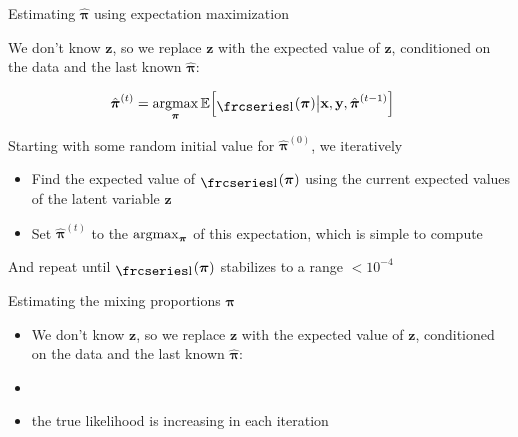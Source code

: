 \documentclass{beamer}
\newcommand{\textfrc}[1]{{\frcseries#1}}
\newcommand{\mathfrc}[1]{\raisebox{-0.8mm}{\text{\textfrc{\small #1}}}\hspace{0.4mm}}
\newcommand{\eqn}[1]{\begin{align*}
#1
\end{align*}}
\newcommand{\vect}[1]{\boldsymbol{\mathbf{#1}}}
\newcommand{\argmax}{\operatornamewithlimits{argmax}}
\newcommand{\vx}{\vect{x}}
\newcommand{\vy}{\vect{y}}
\newcommand{\vp}{\vect{\pi}}
\newcommand{\vph}{\hat{\vect{\pi}}}
\newcommand{\llp}{\mathfrc{l}(\vect{\pi})}
\begin{document}
\begin{frame}{Estimating $\vph$ using expectation maximization}
	
	We don't know $\vect{z}$, so we replace $\vect{z}$ with the expected value of $\vect{z}$, conditioned on the data and the last known $\vph$:
	
	
	\eqn{
		\vph^{(t)} &= \argmax_{\vp} \mathbb{E}\Big[\llp \big| \vx,\vy,\vph^{(t-1)} \Big]   
	}
	
	Starting with some random initial value for $\vph^{(0)}$, we iteratively
	
	\begin{itemize}
		\item Find the expected value of $\llp$ using the current expected values of the latent variable $\vect{z}$
		\item Set $\vph^{(t)}$ to the $\argmax_{\vp}$ of this expectation, which is simple to compute
	\end{itemize}
	
	And repeat until $\llp$ stabilizes to a range  $< 10^{-4}$
	
	
	
\end{frame}
\begin{frame}[shrink]{Estimating the mixing proportions $\vect{\pi}$}
	
	\begin{itemize}
		\item We don't know $\vect{z}$, so we replace $\vect{z}$ with the expected value of $\vect{z}$, conditioned on the data and the last known $\vph$:
		\item 
		\item the true likelihood is increasing in each iteration
	\end{itemize}
	
\end{frame}
\end{document}
